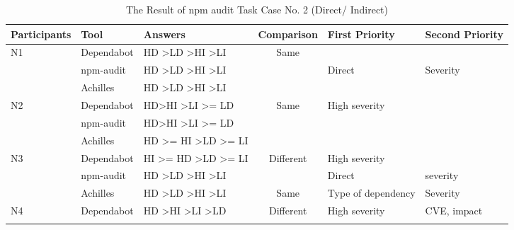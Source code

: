 \documentclass[conference]{IEEEtran}
\begin{document}
	\begin{table}[tb]
		\centering
		\caption{The Result of npm audit Task Case No. 2 (Direct/ Indirect)}
		\begin{tabular}{|l|l|l|c|l|l|}
			\hline
			Participants         & Tool       & Answers                                                     & \multicolumn{1}{l|}{Comparison} & First Priority             & Second Priority           \\ \hline
			\multirow{3}{*}{N1}  & Dependabot & HD \textgreater LD \textgreater HI \textgreater LI          & \multirow{3}{*}{Same}           &                            &                           \\ \cline{2-3} \cline{5-6} 
			& npm-audit  & HD \textgreater LD \textgreater HI \textgreater LI          &                                 & Direct                     & Severity                  \\ \cline{2-3} \cline{5-6} 
			& Achilles   & HD \textgreater LD \textgreater HI \textgreater LI          &                                 &                            &                           \\ \hline
			\multirow{3}{*}{N2}  & Dependabot & HD\textgreater HI \textgreater LI \textgreater = LD         & \multirow{3}{*}{Same}           & High severity              &                           \\ \cline{2-3} \cline{5-6} 
			& npm-audit  & HD\textgreater HI \textgreater LI \textgreater = LD         &                                 &                            &                           \\ \cline{2-3} \cline{5-6} 
			& Achilles   & HD \textgreater{}= HI \textgreater LD \textgreater{}= LI    &                                 &                            &                           \\ \hline
			\multirow{3}{*}{N3}  & Dependabot & HI \textgreater{}= HD \textgreater LD \textgreater{}= LI    & \multirow{2}{*}{Different}      & High severity              &                           \\ \cline{2-3} \cline{5-6} 
			& npm-audit  & HD \textgreater LD \textgreater HI \textgreater LI          &                                 & Direct                     & severity                  \\ \cline{2-6} 
			& Achilles   & HD \textgreater LD \textgreater HI \textgreater LI          & Same                            & Type of dependency         & Severity                  \\ \hline
			\multirow{3}{*}{N4}  & Dependabot & HD \textgreater HI \textgreater LI \textgreater LD          & \multirow{2}{*}{Different}      & High severity              & CVE, impact               \\ \cline{2-3} \cline{5-6} 

\end{tabular}
\end{table}
\end{document}
